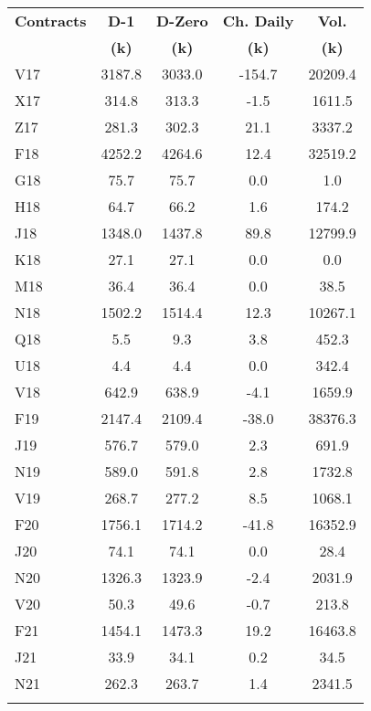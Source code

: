 \documentclass[article,crop=false]{standalone}%
\begin{document}
%
\normalsize%
\setlength{\tabcolsep}{0.15cm}%
\begin{tabular}[h]{l | c c c c}%
\hline%
\rowcolor{white}%
\textbf{Contracts}&\textbf{D{-}1}&\textbf{D{-}Zero}&\textbf{Ch. Daily}&\textbf{Vol.}\\%
\rowcolor{white}%
\textbf{}&\textbf{(k)}&\textbf{(k)}&\textbf{(k)}&\textbf{(k)}\\%
\hline%
\rowcolor{lightgray}%
V17&3187.8&3033.0&{-}154.7&20209.4\\%
\rowcolor{white}%
X17&314.8&313.3&{-}1.5&1611.5\\%
\rowcolor{lightgray}%
Z17&281.3&302.3&21.1&3337.2\\%
\rowcolor{white}%
F18&4252.2&4264.6&12.4&32519.2\\%
\rowcolor{lightgray}%
G18&75.7&75.7&0.0&1.0\\%
\rowcolor{white}%
H18&64.7&66.2&1.6&174.2\\%
\rowcolor{lightgray}%
J18&1348.0&1437.8&89.8&12799.9\\%
\rowcolor{white}%
K18&27.1&27.1&0.0&0.0\\%
\rowcolor{lightgray}%
M18&36.4&36.4&0.0&38.5\\%
\rowcolor{white}%
N18&1502.2&1514.4&12.3&10267.1\\%
\rowcolor{lightgray}%
Q18&5.5&9.3&3.8&452.3\\%
\rowcolor{white}%
U18&4.4&4.4&0.0&342.4\\%
\rowcolor{lightgray}%
V18&642.9&638.9&{-}4.1&1659.9\\%
\rowcolor{white}%
F19&2147.4&2109.4&{-}38.0&38376.3\\%
\rowcolor{lightgray}%
J19&576.7&579.0&2.3&691.9\\%
\rowcolor{white}%
N19&589.0&591.8&2.8&1732.8\\%
\rowcolor{lightgray}%
V19&268.7&277.2&8.5&1068.1\\%
\rowcolor{white}%
F20&1756.1&1714.2&{-}41.8&16352.9\\%
\rowcolor{lightgray}%
J20&74.1&74.1&0.0&28.4\\%
\rowcolor{white}%
N20&1326.3&1323.9&{-}2.4&2031.9\\%
\rowcolor{lightgray}%
V20&50.3&49.6&{-}0.7&213.8\\%
\rowcolor{white}%
F21&1454.1&1473.3&19.2&16463.8\\%
\rowcolor{lightgray}%
J21&33.9&34.1&0.2&34.5\\%
\rowcolor{white}%
N21&262.3&263.7&1.4&2341.5\\%
\rowcolor{lightgray}%

\end{tabular}
\end{document}
